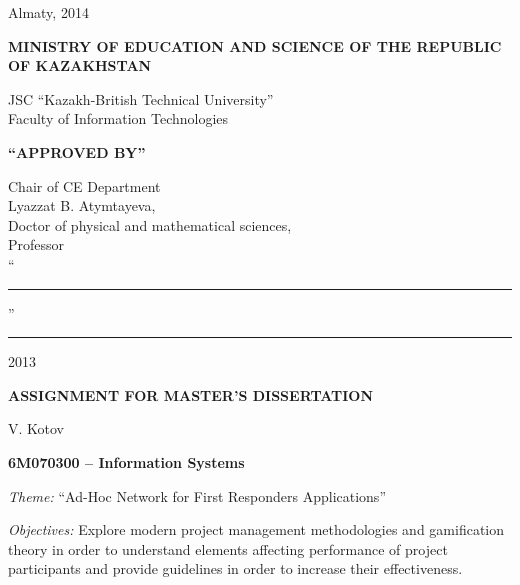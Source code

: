 \begin{titlepage}
\begin{center}
    \end{center}


    \begin{center}
        \vfill
        Almaty, 2014
    \end{center}

    \pagebreak


    \begin{center}
    {\bf{\MakeUppercase{Ministry of education and science of the republic of Kazakhstan}}

        \vspace{14pt}

        JSC ``Kazakh-British Technical University''\\
        Faculty of Information Technologies}

        \vspace{14pt}
        
        \begin{flushright}
            {\bf \MakeUppercase{``Approved by''}}

            Chair of CE Department\\
            Lyazzat B. Atymtayeva,\\
            Doctor of physical and mathematical sciences,\\
            Professor\\

            \vspace{0.5\baselineskip}
            ``\rule{2em}{0.4pt}'' \rule{8em}{0.4pt} 2013\\
            \end{flushright}
        
        {\bf
        \MakeUppercase{Assignment for master's dissertation}}

    \end{center}

    \setlength{\parindent}{0pt}
    \setlength{\parskip}{1ex plus 0.5ex minus 0.2ex}

    V. Kotov

    {\bf 6M070300 -- Information Systems}

    \emph{Theme:} ``Ad-Hoc Network for First Responders Applications''
    
   \emph{Objectives:}
    Explore modern project management methodologies and gamification theory in order to understand elements affecting performance of project participants and provide guidelines in order to increase their effectiveness.
    

\end{titlepage}
